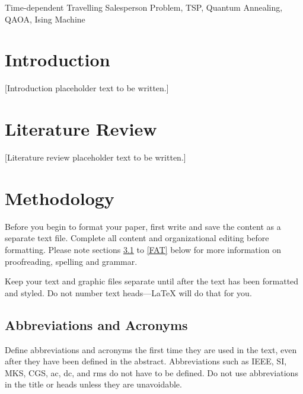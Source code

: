 \documentclass[conference]{IEEEtran}
\begin{document}
\begin{IEEEkeywords}
Time-dependent Travelling Salesperson Problem, TSP, Quantum Annealing, QAOA, Ising Machine
\end{IEEEkeywords}

\section{Introduction}

[Introduction placeholder text to be written.]

\section{Literature Review}

[Literature review placeholder text to be written.]

\section{Methodology}
Before you begin to format your paper, first write and save the content as a 
separate text file. Complete all content and organizational editing before 
formatting. Please note sections \ref{AA} to \ref{FAT} below for more information on 
proofreading, spelling and grammar.

Keep your text and graphic files separate until after the text has been 
formatted and styled. Do not number text heads---{\LaTeX} will do that 
for you.

\subsection{Abbreviations and Acronyms}\label{AA}
Define abbreviations and acronyms the first time they are used in the text, 
even after they have been defined in the abstract. Abbreviations such as 
IEEE, SI, MKS, CGS, ac, dc, and rms do not have to be defined. Do not use 
abbreviations in the title or heads unless they are unavoidable.
\end{document}
